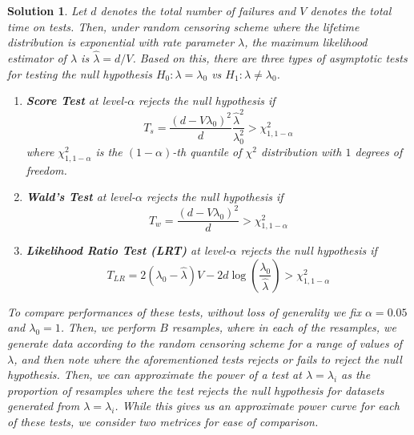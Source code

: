 \documentclass[12pt]{article}
\theoremstyle{problemstyle}
\newtheorem*{solution*}{Solution}
\begin{document}
\begin{solution*}
    Let $d$ denotes the total number of failures and $V$ denotes the total time on tests. Then, under random censoring scheme where the lifetime distribution is exponential with rate parameter $\lambda$, the maximum likelihood estimator of $\lambda$ is $\widehat{\lambda} = d/V$. Based on this, there are three types of asymptotic tests for testing the null hypothesis $H_0 : \lambda = \lambda_0$ vs $H_1 : \lambda \neq \lambda_0$. 

    \begin{enumerate}
        \item \textbf{Score Test} at level-$\alpha$ rejects the null hypothesis if 
        $$
        T_s = \dfrac{(d - V\lambda_0)^2}{d} \dfrac{\widehat{\lambda}^2}{\lambda_0^2} > \chi^2_{1, 1-\alpha}
        $$
        \noindent where $\chi^2_{1, 1-\alpha}$ is the $(1 - \alpha)$-th quantile of $\chi^2$ distribution with $1$ degrees of freedom.
        \item \textbf{Wald's Test} at level-$\alpha$ rejects the null hypothesis if 
        $$
        T_w = \dfrac{(d - V\lambda_0)^2}{d} > \chi^2_{1, 1-\alpha}
        $$
        \item \textbf{Likelihood Ratio Test (LRT)} at level-$\alpha$ rejects the null hypothesis if 
        $$
        T_{LR} = 2(\lambda_0 - \widehat{\lambda})V - 2d\log\left( \dfrac{\lambda_0}{\widehat{\lambda}} \right) > \chi^2_{1, 1-\alpha}
        $$
    \end{enumerate}

    To compare performances of these tests, without loss of generality we fix $\alpha = 0.05$ and $\lambda_0 = 1$. Then, we perform $B$ resamples, where in each of the resamples, we generate data according to the random censoring scheme for a range of values of $\lambda$, and then note where the aforementioned tests rejects or fails to reject the null hypothesis. Then, we can approximate the power of a test at $\lambda = \lambda_i$ as the proportion of resamples where the test rejects the null hypothesis for datasets generated from $\lambda = \lambda_i$. While this gives us an approximate power curve for each of these tests, we consider two metrices for ease of comparison.


\end{solution*}
\end{document}
